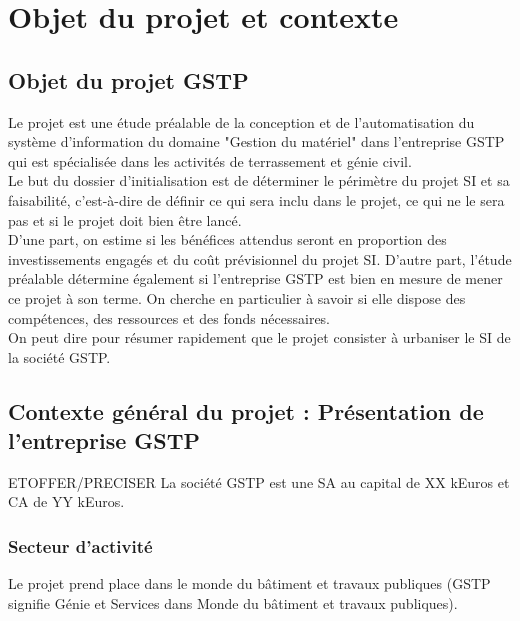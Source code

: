 \section{Objet du projet et contexte}

\subsection{Objet du projet GSTP}
Le projet est une étude préalable de la conception et de l'automatisation
du système d'information du domaine "Gestion du matériel" dans l'entreprise 
GSTP qui est spécialisée dans les activités de terrassement et génie civil.\\

Le but du dossier d'initialisation est de déterminer le périmètre du projet
SI et sa faisabilité, c’est-à-dire de définir ce qui sera inclu
dans le projet, ce qui ne le sera pas et si le projet doit bien être
lancé.\\

D’une part, on estime si les bénéfices attendus seront en proportion des
investissements engagés et du coût prévisionnel du projet SI.  D’autre
part, l’étude préalable détermine également si l’entreprise GSTP est
bien en mesure de mener ce projet à son terme. On cherche en particulier
à savoir si elle dispose des compétences, des ressources et des fonds
nécessaires.\\

On peut dire pour résumer rapidement que le projet consister à urbaniser le
SI de la société GSTP.


\subsection{Contexte général du projet : Présentation de l'entreprise GSTP}

ETOFFER/PRECISER
La société GSTP est une SA au capital de XX kEuros et CA de YY kEuros.

\subsubsection{Secteur d'activité}
Le projet prend place dans le monde du bâtiment et travaux publiques (GSTP
signifie Génie et Services dans Monde du bâtiment et travaux publiques).


